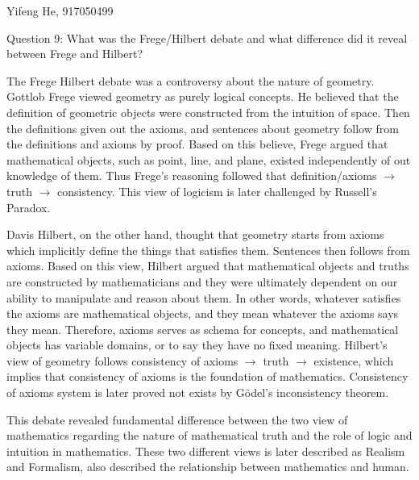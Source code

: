 \documentclass[11pt]{article}
\begin{document}
\begin{center}
    Yifeng He, 917050499
\end{center}

\begin{center}
    Question 9:
    What was the Frege/Hilbert debate and what difference did it reveal between Frege and Hilbert?
\end{center}

The Frege Hilbert debate was a controversy about the nature of geometry.
Gottlob Frege viewed geometry as purely logical concepts.
He believed that the definition of 
geometric objects were constructed from the intuition of space.
Then the definitions given out the axioms,
and sentences about geometry follow from the definitions and axioms by proof.
Based on this believe,
Frege argued that mathematical objects,
such as point, line, and plane,
existed independently of out knowledge of them.
Thus Frege's reasoning followed that
definition/axioms $\rightarrow$ truth $\rightarrow$ consistency.
This view of logicism is later challenged by Russell's Paradox.

Davis Hilbert, on the other hand,
thought that geometry starts from axioms
which implicitly define the things that satisfies them.
Sentences then follows from axioms.
Based on this view,
Hilbert argued that mathematical objects and truths are constructed by mathematicians
and they were ultimately dependent on our ability to manipulate and reason about them.
In other words, whatever satisfies the axioms are mathematical objects,
and they mean whatever the axioms says they mean.
Therefore, axioms serves as schema for concepts,
and mathematical objects has variable domains,
or to say they have no fixed meaning.
Hilbert's view of geometry follows
consistency of axioms $\rightarrow$ truth $\rightarrow$ existence,
which implies that consistency of axioms is the foundation of mathematics.
Consistency of axioms system is later proved not exists by G\"odel's inconsistency theorem.

This debate revealed fundamental difference between the two view of mathematics
regarding the nature of mathematical truth
and the role of logic and intuition in mathematics. 
These two different views is later described as Realism and Formalism,
also described the relationship between mathematics and human.
\end{document}
